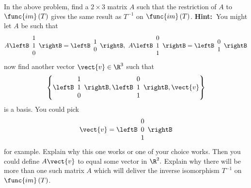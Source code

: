 \begin{enumialphparenastyle}
\begin{ex} In the above problem, find a $2\times 3$ matrix $A$ such that the
restriction of $A$ to $\func{im}\left( T\right) $ gives the same result as $
T^{-1}$ on $\func{im}\left( T\right) $. \textbf{Hint:\ }You might let $A$ be
such that 
\begin{equation*}
A\leftB 
\begin{array}{c}
1 \\ 
1 \\ 
0
\end{array}
\rightB =\leftB 
\begin{array}{c}
1 \\ 
0
\end{array}
\rightB ,\ A\leftB 
\begin{array}{c}
0 \\ 
1 \\ 
1
\end{array}
\rightB =\leftB 
\begin{array}{c}
0 \\ 
1
\end{array}
\rightB
\end{equation*}
now find another vector $\vect{v}\in \R^{3}$ such that 
\begin{equation*}
\left\{ \leftB 
\begin{array}{c}
1 \\ 
1 \\ 
0
\end{array}
\rightB ,\leftB 
\begin{array}{c}
0 \\ 
1 \\ 
1
\end{array}
\rightB ,\vect{v}\right\}
\end{equation*}
is a basis. You could pick 
\begin{equation*}
\vect{v}=\leftB 
\begin{array}{c}
0 \\ 
0 \\ 
1
\end{array}
\rightB
\end{equation*}
for example. Explain why this one works or one of your choice works. Then
you could define $A\vect{v}$ to equal some vector in $\R^{2}.$
Explain why there will be more than one such matrix $A$ which will deliver
the inverse isomorphism $T^{-1}$ on $\func{im}\left( T\right) $.
\end{ex}



\end{enumialphparenastyle}
